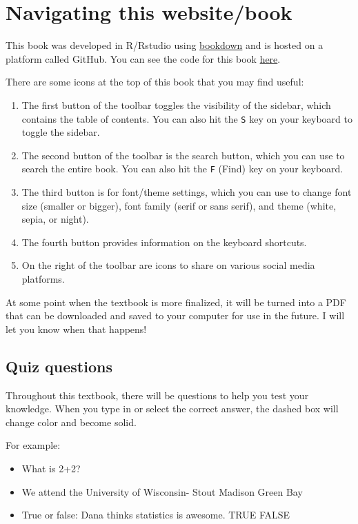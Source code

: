\documentclass[
]{book}
\begin{document}
\hypertarget{navigating-this-websitebook}{%
\section{Navigating this website/book}\label{navigating-this-websitebook}}

This book was developed in R/Rstudio using \href{https://bookdown.org/yihui/bookdown}{bookdown} and is hosted on a platform called GitHub. You can see the code for this book \href{https://github.com/danawanzer/stats-with-jamovi}{here}.

There are some icons at the top of this book that you may find useful:

\begin{enumerate}
\def\labelenumi{\arabic{enumi}.}
\item
  The first button of the toolbar toggles the visibility of the sidebar, which contains the table of contents. You can also hit the \texttt{S} key on your keyboard to toggle the sidebar.
\item
  The second button of the toolbar is the search button, which you can use to search the entire book. You can also hit the \texttt{F} (Find) key on your keyboard.
\item
  The third button is for font/theme settings, which you can use to change font size (smaller or bigger), font family (serif or sans serif), and theme (white, sepia, or night).
\item
  The fourth button provides information on the keyboard shortcuts.
\item
  On the right of the toolbar are icons to share on various social media platforms.
\end{enumerate}

At some point when the textbook is more finalized, it will be turned into a PDF that can be downloaded and saved to your computer for use in the future. I will let you know when that happens!

\hypertarget{quiz-questions}{%
\subsection{Quiz questions}\label{quiz-questions}}

Throughout this textbook, there will be questions to help you test your knowledge. When you type in or select the correct answer, the dashed box will change color and become solid.

For example:

\begin{itemize}
\item
  What is 2+2?
\item
  We attend the University of Wisconsin- Stout Madison Green Bay
\item
  True or false: Dana thinks statistics is awesome. TRUE FALSE
\end{itemize}
\end{document}
